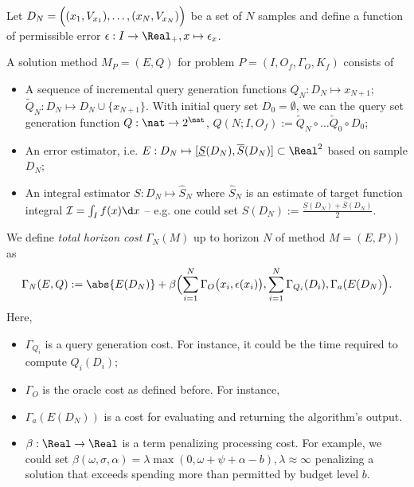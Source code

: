 Let $D_N = \Bigl( (x_1, V_{x_1}),\ldots,(x_N, V_{x_N}) \Bigr)$ be a set of $N$ samples
and define a function of permissible error $\epsilon : I \to \Real_+, x\mapsto \epsilon_x$.

\begin{defn}
A solution method $M_P = (E,Q)$ for problem $P = (I,O_f,\Gamma_O,K_f)$ consists of 
\begin{itemize}
 \item A sequence of incremental query generation functions $Q_N: D_N \mapsto x_{N+1}$; $\tilde Q_N: D_N \mapsto D_N \cup \{x_{N+1}\}$. 
With initial query set $D_0 = \emptyset$, we can the query set generation function $Q: \nat \to 2^{\nat}$, $Q(N; I, O_f) :=  \tilde Q_N \circ \ldots  \tilde Q_0 \circ D_0 $;
 \item An error estimator, i.e. $E: D_N \mapsto  [\underline S (D_N), \overline S (D_N) ] \subset\Real^2$  based on sample $D_N$;
\item An integral estimator $S: D_N \mapsto  \hat S_N$ where $\hat S_N$ is an estimate of target function integral $\mathcal I = \int_I f(x) \d x$ -- e.g. one could set $S(D_N) := \frac{\underline S (D_N) + \overline S(D_N)}{2}$.
 \end{itemize}
\end{defn}

\begin{defn}

We define  \emph{ total horizon cost} $\Gamma_N(M)$ up to horizon $N$ of method $M = (E,P)$)  as   
\[\Gamma_N(E,Q) := \abs{E(D_N)} + \beta\Bigl( \sum_{i=1}^N \Gamma_O \bigl(x_i,\epsilon(x_i)\bigl), \sum_{i=1}^N \Gamma_{Q_i}(D_i), \Gamma_a(E(D_N) \Bigr).\] Here, 
\begin{itemize}
\item $\Gamma_{Q_i}$ is a query generation cost. For instance, it could be the time required to compute $Q_i(D_i)$;
\item $\Gamma_O$ is the oracle cost as defined before. For instance,  
\item $\Gamma_a (E(D_N))$ is a cost for evaluating and returning the algorithm's output.
\item $\beta: \Real \to \Real$ is a term penalizing processing cost. For example, we could set $\beta (\omega,\sigma,\alpha) = \lambda \max(0, \omega + \psi + \alpha - b), \lambda \approx \infty$ penalizing a solution that exceeds spending more than permitted by budget level $b$.
\end{itemize}
\end{defn}

